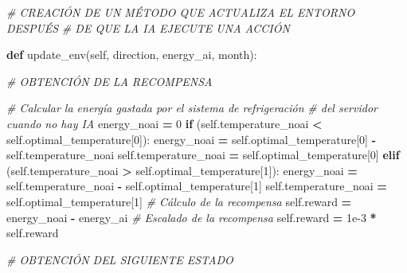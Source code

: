 \documentclass[
]{book}
\newenvironment{Shaded}{\begin{snugshade}}{\end{snugshade}}
\newcommand{\CommentTok}[1]{\textcolor[rgb]{0.56,0.35,0.01}{\textit{#1}}}
\newcommand{\ControlFlowTok}[1]{\textcolor[rgb]{0.13,0.29,0.53}{\textbf{#1}}}
\newcommand{\DecValTok}[1]{\textcolor[rgb]{0.00,0.00,0.81}{#1}}
\newcommand{\FloatTok}[1]{\textcolor[rgb]{0.00,0.00,0.81}{#1}}
\newcommand{\KeywordTok}[1]{\textcolor[rgb]{0.13,0.29,0.53}{\textbf{#1}}}
\newcommand{\NormalTok}[1]{#1}
\newcommand{\OperatorTok}[1]{\textcolor[rgb]{0.81,0.36,0.00}{\textbf{#1}}}
\newcommand{\VariableTok}[1]{\textcolor[rgb]{0.00,0.00,0.00}{#1}}
\begin{document}
\begin{Shaded}
\begin{Highlighting}[]
    \CommentTok{\# CREACIÓN DE UN MÉTODO QUE ACTUALIZA EL ENTORNO DESPUÉS }
    \CommentTok{\# DE QUE LA IA EJECUTE UNA ACCIÓN}
    
    \KeywordTok{def}\NormalTok{ update\_env(}\VariableTok{self}\NormalTok{, direction, energy\_ai, month):}
        
        \CommentTok{\# OBTENCIÓN DE LA RECOMPENSA}
        
        \CommentTok{\# Calcular la energía gastada por el sistema de refrigeración }
        \CommentTok{\# del servidor cuando no hay IA}
\NormalTok{        energy\_noai }\OperatorTok{=} \DecValTok{0}
        \ControlFlowTok{if}\NormalTok{ (}\VariableTok{self}\NormalTok{.temperature\_noai }\OperatorTok{\textless{}} \VariableTok{self}\NormalTok{.optimal\_temperature[}\DecValTok{0}\NormalTok{]):}
\NormalTok{            energy\_noai }\OperatorTok{=} \VariableTok{self}\NormalTok{.optimal\_temperature[}\DecValTok{0}\NormalTok{] }\OperatorTok{{-}} \VariableTok{self}\NormalTok{.temperature\_noai}
            \VariableTok{self}\NormalTok{.temperature\_noai }\OperatorTok{=} \VariableTok{self}\NormalTok{.optimal\_temperature[}\DecValTok{0}\NormalTok{]}
        \ControlFlowTok{elif}\NormalTok{ (}\VariableTok{self}\NormalTok{.temperature\_noai }\OperatorTok{\textgreater{}} \VariableTok{self}\NormalTok{.optimal\_temperature[}\DecValTok{1}\NormalTok{]):}
\NormalTok{            energy\_noai }\OperatorTok{=} \VariableTok{self}\NormalTok{.temperature\_noai }\OperatorTok{{-}} \VariableTok{self}\NormalTok{.optimal\_temperature[}\DecValTok{1}\NormalTok{]}
            \VariableTok{self}\NormalTok{.temperature\_noai }\OperatorTok{=} \VariableTok{self}\NormalTok{.optimal\_temperature[}\DecValTok{1}\NormalTok{]}
        \CommentTok{\# Cálculo de la recompensa}
        \VariableTok{self}\NormalTok{.reward }\OperatorTok{=}\NormalTok{ energy\_noai }\OperatorTok{{-}}\NormalTok{ energy\_ai}
        \CommentTok{\# Escalado de la recompensa}
        \VariableTok{self}\NormalTok{.reward }\OperatorTok{=} \FloatTok{1e{-}3} \OperatorTok{*} \VariableTok{self}\NormalTok{.reward}
        
        \CommentTok{\# OBTENCIÓN DEL SIGUIENTE ESTADO}
        

\end{Highlighting}
\end{Shaded}
\end{document}
